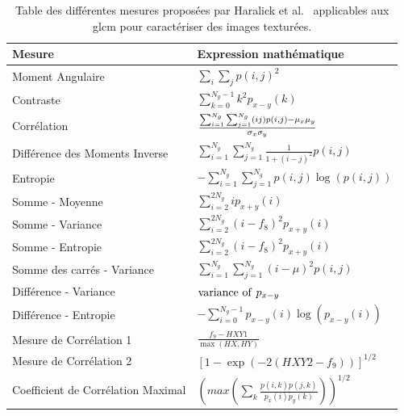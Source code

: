 \begin{table}[H]
    \centering
    \begin{tabular}{ll}
        \toprule
        \textbf{Mesure}                     & \textbf{Expression mathématique}                                                              \\ \hline
        Moment Angulaire                    & $ \sum_i\sum_jp(i,j)^2$                                                                       \\
        Contraste                           & $\sum_{k=0}^{N_g-1} k^2 p_{x-y}(k)$                                                           \\
        Corrélation                         & $\frac{\Large{\sum_{i=1}^{N_g}\sum_{j=1}^{N_g}} (ij)p(i,j) - \mu_x\mu_y}{\sigma_x\sigma_y}$   \\
        Différence des Moments Inverse      & $\sum_{i=1}^{N_g}\sum_{j=1}^{N_g} \frac{1}{1 + (i - j)^2} p(i,j)$                             \\   
        Entropie                            & $-\sum_{i=1}^{N_g}\sum_{j=1}^{N_g} p(i,j) \log(p(i,j))$                                       \\   
        Somme - Moyenne                     & $\sum_{i=2}^{2N_g} i p_{x+y}(i)$                                                              \\    
        Somme - Variance                    & $\sum_{i=2}^{2N_g} (i - f_8)^2 p_{x+y}(i)$                                                    \\    
        Somme - Entropie                    & $\sum_{i=2}^{2N_g} (i - f_8)^2 p_{x+y}(i)$                                                    \\    
        Somme des carrés - Variance         & $\sum_{i=1}^{N_g}\sum_{j=1}^{N_g} (i - \mu)^2 p(i,j)$                                         \\   
        Différence - Variance               & ${\rm variance \ of ~} p_{x-y}$                                                               \\    
        Différence - Entropie               & $-\sum_{i=0}^{N_g-1} p_{x-y}(i) \log(p_{x-y}(i))$                                             \\
        Mesure de Corrélation 1             & $\frac{f_9 - HXY1}{\max(HX,HY)}$                                                              \\  
        Mesure de Corrélation 2             & $[1 - \exp(-2(HXY2 - f_9))]^{1/2}$                                                            \\ 
        Coefficient de Corrélation Maximal  & $(max(\sum_k \frac{p(i,k)p(j,k)}{p_x(i)p_y(k)}))^{1/2}$                                       \\ 
        \bottomrule
    \end{tabular}
    \caption{Table des différentes mesures proposées par Haralick et al.~\cite{Haralick1973} applicables aux \gls{glcm} pour caractériser des images texturées.}
    \label{tab:haralick_descriptors}
\end{table}\par
 
